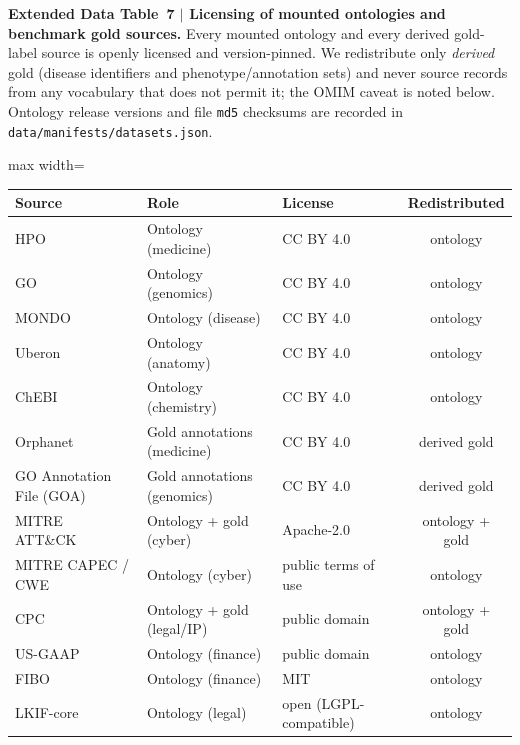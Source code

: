 \documentclass[pdflatex,sn-nature]{sn-jnl}
\newcommand{\edcaption}[1]{\par{\small #1}\par\smallskip}
\begin{document}
\begin{appendices}
\begin{table}[htbp]
\centering
\edcaption{\textbf{Extended Data Table~7 $|$ Licensing of mounted ontologies and
    benchmark gold sources.}
  Every mounted ontology and every derived gold-label source is openly licensed
  and version-pinned. We redistribute only \emph{derived} gold (disease
  identifiers and phenotype/annotation sets) and never source records from any
  vocabulary that does not permit it; the OMIM caveat is noted below. Ontology
  release versions and file \texttt{md5} checksums are recorded in
  \texttt{data/manifests/datasets.json}.}
\small
\setlength{\tabcolsep}{5pt}
\begin{adjustbox}{max width=\textwidth}\begin{tabular}{lllc}
\toprule
\textbf{Source} & \textbf{Role} & \textbf{License} & \textbf{Redistributed} \\
\midrule
HPO~\cite{kohler2021hpo}            & Ontology (medicine)        & CC BY 4.0      & ontology \\
GO~\cite{ashburner2000go}           & Ontology (genomics)        & CC BY 4.0      & ontology \\
MONDO~\cite{vasilevsky2022mondo}    & Ontology (disease)         & CC BY 4.0      & ontology \\
Uberon                              & Ontology (anatomy)         & CC BY 4.0      & ontology \\
ChEBI                               & Ontology (chemistry)       & CC BY 4.0      & ontology \\
Orphanet                            & Gold annotations (medicine)& CC BY 4.0      & derived gold \\
GO Annotation File (GOA)            & Gold annotations (genomics)& CC BY 4.0      & derived gold \\
MITRE ATT\&CK~\cite{strom2018attack}& Ontology + gold (cyber)    & Apache-2.0     & ontology + gold \\
MITRE CAPEC / CWE                   & Ontology (cyber)           & public terms of use & ontology \\
CPC                                 & Ontology + gold (legal/IP) & public domain  & ontology + gold \\
US-GAAP                             & Ontology (finance)         & public domain  & ontology \\
FIBO                                & Ontology (finance)         & MIT            & ontology \\
LKIF-core                           & Ontology (legal)           & open (LGPL-compatible) & ontology \\

\end{tabular}
\end{adjustbox}
\end{table}
\end{appendices}
\end{document}
